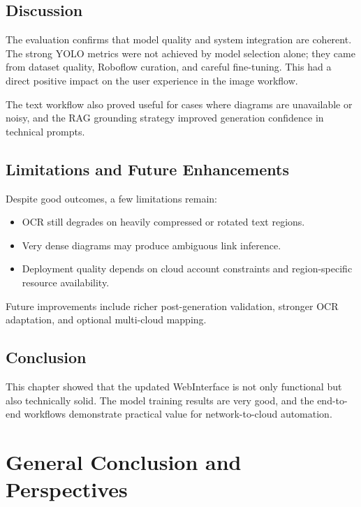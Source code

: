 \documentclass[12pt,a4paper,openany]{report}
\begin{document}
\section{Discussion}

The evaluation confirms that model quality and system integration are coherent. The strong YOLO metrics were not achieved by model selection alone; they came from dataset quality, Roboflow curation, and careful fine-tuning. This had a direct positive impact on the user experience in the image workflow.

The text workflow also proved useful for cases where diagrams are unavailable or noisy, and the RAG grounding strategy improved generation confidence in technical prompts.

\section{Limitations and Future Enhancements}

Despite good outcomes, a few limitations remain:
\begin{itemize}
    \item OCR still degrades on heavily compressed or rotated text regions.
    \item Very dense diagrams may produce ambiguous link inference.
    \item Deployment quality depends on cloud account constraints and region-specific resource availability.
\end{itemize}

Future improvements include richer post-generation validation, stronger OCR adaptation, and optional multi-cloud mapping.

\section{Conclusion}

This chapter showed that the updated WebInterface is not only functional but also technically solid. The model training results are very good, and the end-to-end workflows demonstrate practical value for network-to-cloud automation.

\chapter*{General Conclusion and Perspectives}
\end{document}
